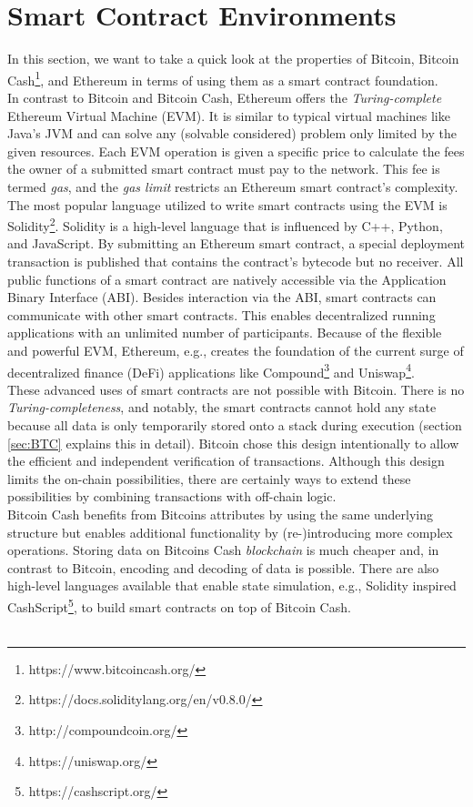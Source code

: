 \documentclass{cacthesis}
\begin{document}
        \section{Smart Contract Environments}
        \label{sec:smartContractOptions}
        In this section, we want to take a quick look at the properties of Bitcoin, Bitcoin Cash\footnote{https://www.bitcoincash.org/}, and Ethereum in terms of using them as a smart contract foundation. \\
        In contrast to Bitcoin and Bitcoin Cash, Ethereum offers the \textit{Turing-complete} Ethereum Virtual Machine (EVM). It is similar to typical virtual machines like Java's JVM and can solve any (solvable considered) problem only limited by the given resources. Each EVM operation is given a specific price to calculate the fees the owner of a submitted smart contract must pay to the network. This fee is termed \textit{gas}, and the \textit{gas limit} restricts an Ethereum smart contract's complexity. The most popular language utilized to write smart contracts using the EVM is Solidity\footnote{https://docs.soliditylang.org/en/v0.8.0/}. Solidity is a high-level language that is influenced by C++, Python, and JavaScript. By submitting an Ethereum smart contract, a special deployment transaction is published that contains the contract's bytecode but no receiver. All public functions of a smart contract are natively accessible via the Application Binary Interface (ABI). Besides interaction via the ABI, smart contracts can communicate with other smart contracts. This enables decentralized running applications with an unlimited number of participants. Because of the flexible and powerful EVM, Ethereum, e.g., creates the foundation of the current surge of decentralized finance (DeFi) applications like Compound\footnote{http://compoundcoin.org/} and Uniswap\footnote{https://uniswap.org/}. \\
        These advanced uses of smart contracts are not possible with Bitcoin. There is no \textit{Turing-completeness}, and notably, the smart contracts cannot hold any state because all data is only temporarily stored onto a stack during execution (section \ref{sec:BTC} explains this in detail). Bitcoin chose this design intentionally to allow the efficient and independent verification of transactions. Although this design limits the on-chain possibilities, there are certainly ways to extend these possibilities by combining transactions with off-chain logic. \\
        Bitcoin Cash benefits from Bitcoins attributes by using the same underlying structure but enables additional functionality by (re-)introducing more complex operations. Storing data on Bitcoins Cash \textit{blockchain} is much cheaper and, in contrast to Bitcoin, encoding and decoding of data is possible. There are also high-level languages available that enable state simulation, e.g., Solidity inspired CashScript\footnote{https://cashscript.org/}, to build smart contracts on top of Bitcoin Cash. \\\\
\end{document}
